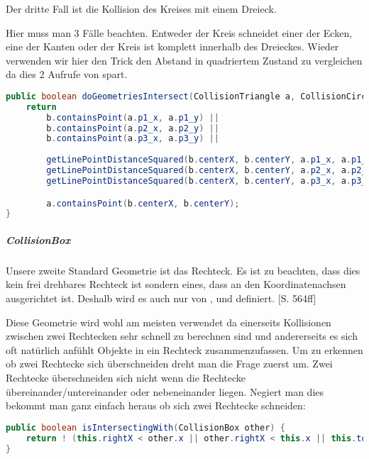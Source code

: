 Der dritte Fall ist die Kollision des Kreises mit einem Dreieck.

Hier muss man 3 Fälle beachten. Entweder der Kreis schneidet einer der Ecken, eine der Kanten oder der Kreis ist komplett innerhalb des Dreieckes. Wieder verwenden wir hier den Trick den Abstand in quadriertem Zustand zu vergleichen da dies 2 Aufrufe von  spart.


\doinline
\begin{lstlisting}[caption=Erkennen von Kollisionen (Kreis-Dreieck), title=\hspace{0 pt}, language=java]
public boolean doGeometriesIntersect(CollisionTriangle a, CollisionCircle b) {
	return 
		b.containsPoint(a.p1_x, a.p1_y) ||
		b.containsPoint(a.p2_x, a.p2_y) ||
		b.containsPoint(a.p3_x, a.p3_y) ||
		
		getLinePointDistanceSquared(b.centerX, b.centerY, a.p1_x, a.p1_y, a.p2_x, a.p2_y) <= (b.radius*b.radius) ||
		getLinePointDistanceSquared(b.centerX, b.centerY, a.p2_x, a.p2_y, a.p3_x, a.p3_y) <= (b.radius*b.radius) ||
		getLinePointDistanceSquared(b.centerX, b.centerY, a.p3_x, a.p3_y, a.p1_x, a.p1_y) <= (b.radius*b.radius) ||

		a.containsPoint(b.centerX, b.centerY);
}
\end{lstlisting}

\subparagraph{CollisionBox}

Unsere zweite Standard Geometrie ist das Rechteck. Es ist zu beachten, dass dies kein frei drehbares Rechteck ist sondern eines, dass an den Koordinatenachsen ausgerichtet ist. Deshalb wird es auch nur von ,  und  definiert. \cite{EMFGAIA}[S. 564ff]

Diese Geometrie wird wohl am meisten verwendet da einerseits Kollisionen zwischen zwei Rechtecken sehr schnell zu berechnen sind und andererseits es sich oft natürlich anfühlt Objekte in ein Rechteck zusammenzufassen. Um zu erkennen ob zwei Rechtecke sich überschneiden dreht man die Frage zuerst um. Zwei Rechtecke überschneiden sich nicht wenn die Rechtecke übereinander/untereinander oder nebeneinander liegen. Negiert man dies bekommt man ganz einfach heraus ob sich zwei Rechtecke schneiden:

\doinline
\begin{lstlisting}[caption=Erkennen von Kollisionen (Box-Box), title=\hspace{0 pt}, language=java]
public boolean isIntersectingWith(CollisionBox other) {
	return ! (this.rightX < other.x || other.rightX < this.x || this.topY < other.y || other.topY < this.y);
}
\end{lstlisting}

